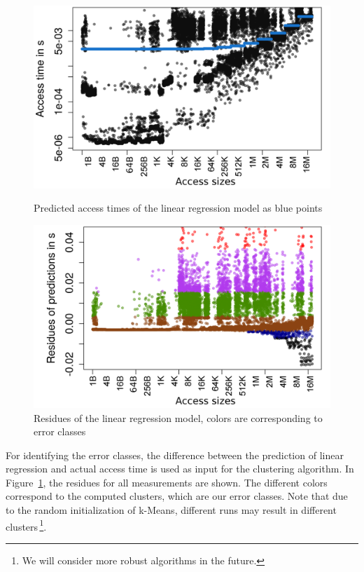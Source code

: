 \documentclass{superfri}
\begin{document}
	\begin{figure}[!h]
		\centering
		\begin{minipage}[b]{0.47\textwidth}
			\includegraphics[width=\textwidth]{src/plot_rnd_linreg_Size.png}
			\caption{Predicted access times of the linear regression model as blue points}
			\label{linreg}
		\end{minipage}
		\hfill
		\begin{minipage}[b]{0.47\textwidth}
			\includegraphics[width=\textwidth]{src/linreg_error_clustering_rnd_all.png}
			\caption{Residues of the linear regression model, colors are corresponding to error classes}
			\label{clustering}
		\end{minipage}
	\end{figure}
	
	For identifying the error classes, the difference between the prediction of linear regression and actual access time is used as input for the clustering algorithm.
	In Figure~\ref{clustering}, the residues for all measurements are shown. The different colors correspond to the computed clusters, which are our error classes. 
	Note that due to the random initialization of k-Means, different runs may result in different clusters\,\footnote{We will consider more robust algorithms in the future.}.
	
\end{document}
